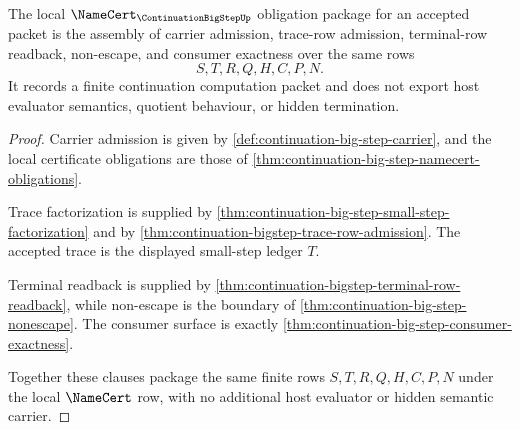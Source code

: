 \begin{theorem}
\label{thm:continuation-bigstep-local-namecert-package}
The local $\NameCert_{\ContinuationBigStepUp}$ obligation package for an
accepted packet is the assembly of carrier admission, trace-row admission,
terminal-row readback, non-escape, and consumer exactness over the same rows
$$
S,T,R,Q,H,C,P,N.
$$
It records a finite continuation computation packet and does not export host
evaluator semantics, quotient behaviour, or hidden termination.
\end{theorem}
\begin{proof}
Carrier admission is given by
\autoref{def:continuation-big-step-carrier}, and the local certificate
obligations are those of
\autoref{thm:continuation-big-step-namecert-obligations}.

Trace factorization is supplied by
\autoref{thm:continuation-big-step-small-step-factorization} and by
\autoref{thm:continuation-bigstep-trace-row-admission}. The accepted trace is
the displayed small-step ledger $T$.

Terminal readback is supplied by
\autoref{thm:continuation-bigstep-terminal-row-readback}, while non-escape is
the boundary of \autoref{thm:continuation-big-step-nonescape}. The consumer
surface is exactly
\autoref{thm:continuation-big-step-consumer-exactness}.

Together these clauses package the same finite rows $S,T,R,Q,H,C,P,N$ under
the local $\NameCert$ row, with no additional host evaluator or hidden
semantic carrier.
\end{proof}

